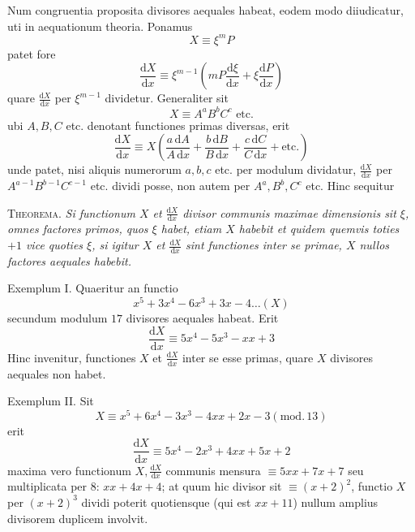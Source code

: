 %
Num congruentia proposita divisores aequales habeat, eodem modo diiudicatur, uti in aequationum theoria. Ponamus
\[
X\equiv\xi^mP
\]
patet fore
\[
\frac{\mathrm{d}X}{\mathrm{d}x}\equiv\xi^{m-1}\left(mP\frac{\mathrm{d}\xi}{\mathrm{d}x}+\xi\frac{\mathrm{d}P}{\mathrm{d}x}\right)
\]
quare $\frac{\mathrm{d}X}{\mathrm{d}x}$ per $\xi^{m-1}$ dividetur. Generaliter sit
\[
X\equiv A^aB^bC^c\text{ etc.}
\]
ubi $A,B,C$ etc. denotant functiones primas diversas, erit
\[
\frac{\mathrm{d}X}{\mathrm{d}x}\equiv X\left(\frac{a\,\mathrm{d}A}{A\,\mathrm{d}x}+\frac{b\,\mathrm{d}B}{B\,\mathrm{d}x}+\frac{c\,\mathrm{d}C}{C\,\mathrm{d}x}+\text{etc.}\right)
\]
unde patet, nisi aliquis numerorum $a,b,c$ etc. per modulum dividatur, $\frac{\mathrm{d}X}{\mathrm{d}x}$ per $A^{a-1}B^{b-1}C^{c-1}$ etc. dividi posse, non autem per $A^a,B^b,C^c$ etc. Hinc sequitur

\textsc{Theorema.} \emph{Si functionum $X$ et $\frac{\mathrm{d}X}{\mathrm{d}x}$ divisor communis maximae dimensionis sit $\xi$, omnes factores primos, quos $\xi$ habet, etiam $X$ habebit et quidem quemvis toties $+1$ vice quoties $\xi$, si igitur $X$ et $\frac{\mathrm{d}X}{\mathrm{d}x}$ sint functiones inter se primae, $X$ nullos factores aequales habebit.}

Exemplum I. Quaeritur an functio
\[
x^5+3x^4-6x^3+3x-4\ldots(X)
\]
secundum modulum $17$ divisores aequales habeat. Erit
\[
\frac{\mathrm{d}X}{\mathrm{d}x}\equiv5x^4-5x^3-xx+3
\]
Hinc invenitur, functiones $X$ et $\frac{\mathrm{d}X}{\mathrm{d}x}$ inter se esse primas, quare $X$ divisores aequales non habet.

Exemplum II. Sit
\[
X\equiv x^5+6x^4-3x^3-4xx+2x-3(\mathrm{mod.}\,13)
\]
erit
\[
\frac{\mathrm{d}X}{\mathrm{d}x}\equiv5x^4-2x^3+4xx+5x+2
\]
maxima vero functionum $X,\frac{\mathrm{d}X}{\mathrm{d}x}$ communis mensura $\equiv5xx+7x+7$ seu 
%
multiplicata per $8$: $xx+4x+4$; at quum hic divisor sit $\equiv(x+2)^2$, functio $X$ per $(x+2)^3$ dividi poterit quotiensque (qui est $xx+11$) nullum amplius divisorem duplicem involvit.

